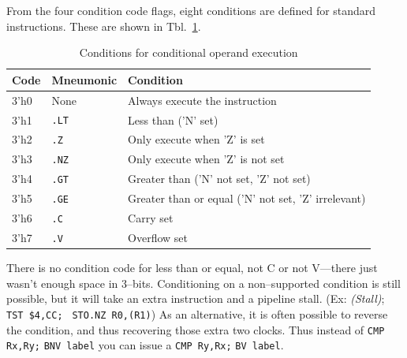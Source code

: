 \documentclass{gqtekspec}
\begin{document}
From the four condition code flags, eight conditions are defined for standard
instructions.  These are shown in Tbl.~\ref{tbl:conditions}.
\begin{table}\begin{center}
\begin{tabular}{l|l|l}
Code & Mneumonic & Condition \\\hline
3'h0 & None & Always execute the instruction \\
3'h1 & {\tt .LT} & Less than ('N' set) \\
3'h2 & {\tt .Z} & Only execute when 'Z' is set \\
3'h3 & {\tt .NZ} & Only execute when 'Z' is not set \\
3'h4 & {\tt .GT} & Greater than ('N' not set, 'Z' not set) \\
3'h5 & {\tt .GE} & Greater than or equal ('N' not set, 'Z' irrelevant) \\
3'h6 & {\tt .C} & Carry set\\
3'h7 & {\tt .V} & Overflow set\\
\end{tabular}
\caption{Conditions for conditional operand execution}\label{tbl:conditions}
\end{center}\end{table}
There is no condition code for less than or equal, not C or not V---there
just wasn't enough space in 3--bits.  Conditioning on a non--supported
condition is still possible, but it will take an extra instruction and a
pipeline stall.  (Ex: \hbox{\em (Stall)}; \hbox{\tt TST \$4,CC;} \hbox{\tt
STO.NZ R0,(R1)}) As an alternative, it is often possible to reverse the
condition, and thus recovering those extra two clocks.  Thus instead of
\hbox{\tt CMP Rx,Ry;} \hbox{\tt BNV label} you can issue a
\hbox{\tt CMP Ry,Rx;} \hbox{\tt BV label}.
\end{document}
